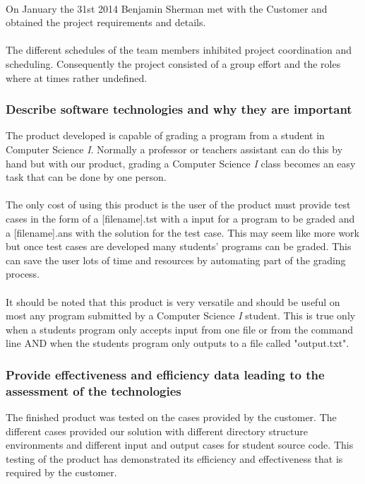 \paragraph{}
On January the 31st 2014 Benjamin Sherman met with the Customer and obtained the project requirements and details.

\paragraph{}
The different schedules of the team members inhibited project coordination and scheduling. Consequently the project consisted of a group effort and the roles where at times rather undefined.

\subsubsection{Describe software technologies and why they are important}
The product developed is capable of grading a program from a student in Computer Science \textit{I}. Normally a professor or teachers assistant can do this by hand but with our product, grading a Computer Science \textit{I} class becomes an easy task that can be done by one person.

\paragraph{} The only cost of using this product is the user of the product must provide test cases in the form of a [filename].tst with a input for a program to be graded and a [filename].ans with the solution for the test case. This may seem like more work but once test cases are developed many students' programs can be graded. This can save the user lots of time and resources by automating part of the grading process.

\paragraph{}
It should be noted that this product is very versatile and should be useful on most any program submitted by a Computer Science \textit{I} student. This is true only when a students program only accepts input from one file or from the command line AND when the students program only outputs to a file called "output.txt".

\subsubsection{Provide effectiveness and efficiency data leading to the assessment of the technologies}
The finished product was tested on the cases provided by the customer. The different cases provided our solution with different directory structure environments and different input and output cases for student source code. This testing of the product has demonstrated its efficiency and effectiveness that is required by the customer.

